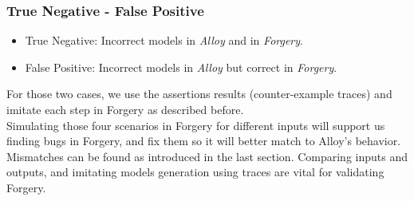 \documentclass[oneside]{book}
\begin{document}
\subsubsection{True Negative - False Positive}
\begin{itemize}
  \item True Negative: Incorrect models in \textit{Alloy} and in \textit{Forgery}.
  \item False Positive: Incorrect models in \textit{Alloy} but correct in \textit{Forgery}.
\end{itemize}

For those two cases, we use the assertions results (counter-example traces) and imitate each step in Forgery as described before.\\

Simulating those four scenarios in Forgery for different inputs will support us finding bugs in Forgery, and fix them so it will better match to Alloy's behavior. Mismatches can be found as introduced in the last section. Comparing inputs and outputs, and imitating models generation using traces are vital for validating Forgery. 

\newpage
\end{document}
